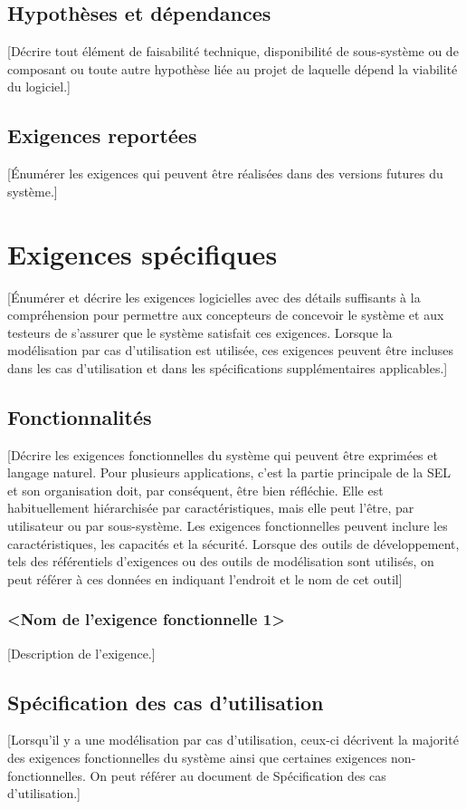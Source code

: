\documentclass[10pt,a4paper]{report}
\begin{document}
\subsection{Hypothèses et dépendances}
[Décrire tout élément de faisabilité technique, disponibilité de sous-système ou de composant ou toute autre hypothèse liée au projet de laquelle dépend la viabilité du logiciel.]

\subsection{Exigences reportées}
[Énumérer les exigences qui peuvent être réalisées dans des versions futures du système.]

\section{Exigences spécifiques}
[Énumérer et décrire les exigences logicielles avec des détails suffisants à la compréhension pour permettre aux concepteurs de concevoir le système et aux testeurs de s’assurer que le système satisfait ces exigences. Lorsque la modélisation par cas d’utilisation est utilisée, ces exigences peuvent être incluses dans les cas d’utilisation et dans les spécifications supplémentaires applicables.]

\subsection{Fonctionnalités}
[Décrire les exigences fonctionnelles du système qui peuvent être exprimées et langage naturel. Pour plusieurs applications, c’est la partie principale de la SEL et son organisation doit, par conséquent, être bien réfléchie. Elle est habituellement hiérarchisée par caractéristiques, mais elle peut l’être, par utilisateur ou par sous-système. Les exigences fonctionnelles peuvent inclure les caractéristiques, les capacités et la sécurité.
Lorsque des outils de développement, tels des référentiels d’exigences ou des outils de modélisation sont utilisés, on peut référer à ces données en indiquant l’endroit et le nom de cet outil]
\subsubsection{\textless Nom de l’exigence fonctionnelle 1\textgreater}
[Description de l’exigence.]

\subsection{Spécification des cas d’utilisation}
[Lorsqu’il y a une modélisation par cas d’utilisation, ceux-ci décrivent la majorité des exigences fonctionnelles du système ainsi que certaines exigences non-fonctionnelles. On peut référer au document de Spécification des cas d’utilisation.]
\end{document}
